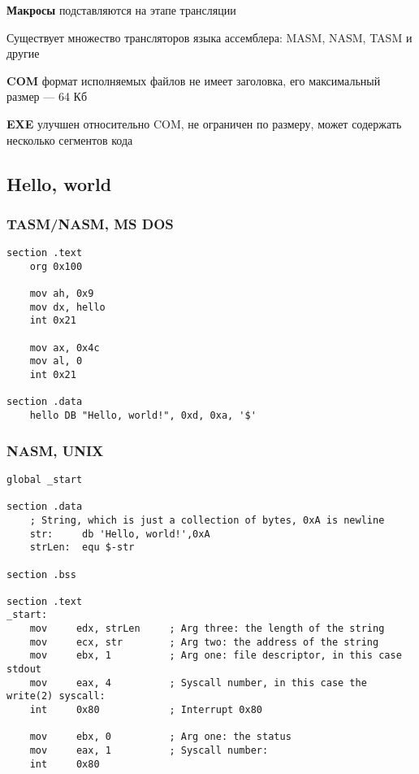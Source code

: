 \documentclass{article}
\begin{document}
\textbf{Макросы} подставляются на этапе трансляции

Существует множество трансляторов языка ассемблера: MASM, NASM, TASM и другие

\hfill

\textbf{COM} формат исполняемых файлов не имеет заголовка, его максимальный размер — 64 Кб

\textbf{EXE} улучшен относительно COM, не ограничен по размеру, может содержать несколько сегментов кода

\pagebreak
\subsection{Hello, world}

\subsubsection{TASM/NASM, MS DOS}

\begin{verbatim}
section .text
    org 0x100

    mov ah, 0x9
    mov dx, hello
    int 0x21
    
    mov ax, 0x4c
    mov al, 0
    int 0x21

section .data
	hello DB "Hello, world!", 0xd, 0xa, '$'
\end{verbatim}

\subsubsection{NASM, UNIX}

\begin{verbatim}
global _start

section .data
    ; String, which is just a collection of bytes, 0xA is newline
    str:     db 'Hello, world!',0xA
    strLen:  equ $-str

section .bss

section .text
_start:
    mov     edx, strLen     ; Arg three: the length of the string
    mov     ecx, str        ; Arg two: the address of the string
    mov     ebx, 1          ; Arg one: file descriptor, in this case stdout
    mov     eax, 4          ; Syscall number, in this case the write(2) syscall: 
    int     0x80            ; Interrupt 0x80        

    mov     ebx, 0          ; Arg one: the status
    mov     eax, 1          ; Syscall number:
    int     0x80
\end{verbatim}
\end{document}
